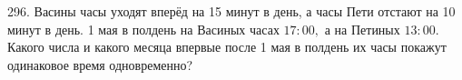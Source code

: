 296. Васины часы уходят вперёд на 15 минут в день, а часы Пети отстают на 10 минут в день. 1 мая в полдень на Васиных часах $17:00,$ а на Петиных $13:00.$ Какого числа и какого месяца впервые после 1 мая в полдень их часы покажут одинаковое время одновременно?\\

